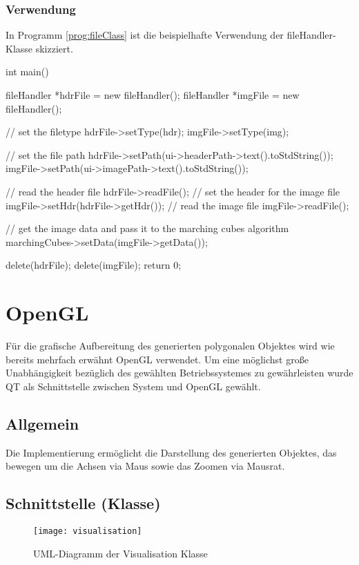 \subsubsection{Verwendung}
In Programm \ref{prog:fileClass} ist die beispielhafte Verwendung der fileHandler-Klasse skizziert.
\begin{program}[H]
	\caption{Verwendung der fileHandler-Klasse}
	\label{prog:fileClass}
	\begin{CCode}
		int main(){
			fileHandler *hdrFile = new fileHandler();
			fileHandler *imgFile = new fileHandler();
			
			// set the filetype
			hdrFile->setType(hdr);
			imgFile->setType(img);
			
			// set the file path
			hdrFile->setPath(ui->headerPath->text().toStdString());
			imgFile->setPath(ui->imagePath->text().toStdString());
			
			// read the header file
			hdrFile->readFile();
			// set the header for the image file
			imgFile->setHdr(hdrFile->getHdr());
			// read the image file
			imgFile->readFile();
			
			// get the image data and pass it to the marching cubes algorithm
			marchingCubes->setData(imgFile->getData());
			
			delete(hdrFile);
			delete(imgFile);
			return 0;	
		}
	\end{CCode}
\end{program}
\section{OpenGL}
Für die grafische Aufbereitung des generierten polygonalen Objektes wird wie bereits mehrfach erwähnt OpenGL verwendet. Um eine möglichst große Unabhängigkeit bezüglich des gewählten Betriebssystemes zu gewährleisten wurde QT als Schnittstelle zwischen System und OpenGL gewählt.
\subsection{Allgemein}
Die Implementierung ermöglicht die Darstellung des generierten Objektes, das bewegen um die Achsen via Maus sowie das Zoomen via Mausrat.
\subsection{Schnittstelle (Klasse)}
\begin{figure}[H]
	\centering
	\texttt{[image: visualisation]}
	\caption{UML-Diagramm der Visualisation Klasse}
	\label{fig:visualisation}
\end{figure}
